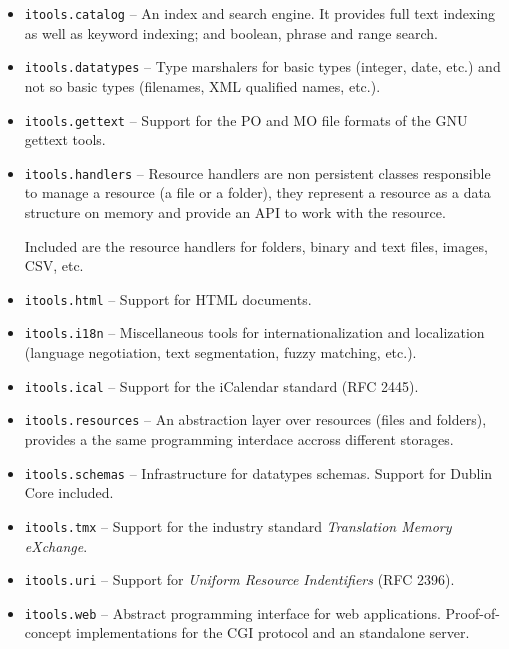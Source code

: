 \begin{itemize}
  \item {\tt itools.catalog} -- An index and search engine. It provides
    full text indexing as well as keyword indexing; and boolean, phrase
    and range search.

  \item {\tt itools.datatypes} -- Type marshalers for basic types (integer,
    date, etc.) and not so basic types (filenames, XML qualified names, etc.).

  \item {\tt itools.gettext} -- Support for the PO and MO file formats of
    the GNU gettext tools.

  \item {\tt itools.handlers} -- Resource handlers are non persistent classes
    responsible to manage a resource (a file or a folder), they represent a
    resource as a data structure on memory and provide an API to work with
    the resource.

    Included are the resource handlers for folders, binary and text files,
    images, CSV, etc.

  \item {\tt itools.html} -- Support for HTML documents.

  \item {\tt itools.i18n} -- Miscellaneous tools for internationalization
    and localization (language negotiation, text segmentation, fuzzy
    matching, etc.).

  \item {\tt itools.ical} -- Support for the iCalendar standard (RFC 2445).

  \item {\tt itools.resources} -- An abstraction layer over resources (files
    and folders), provides a the same programming interdace accross different
    storages.

  \item {\tt itools.schemas} -- Infrastructure for datatypes schemas. Support
    for Dublin Core included.

  \item {\tt itools.tmx} -- Support for the industry standard
    {\em Translation Memory eXchange}.

  \item {\tt itools.uri} -- Support for {\em Uniform Resource Indentifiers}
    (RFC 2396).

  \item {\tt itools.web} -- Abstract programming interface for web
    applications. Proof-of-concept implementations for the CGI protocol
    and an standalone server.


\end{itemize}
